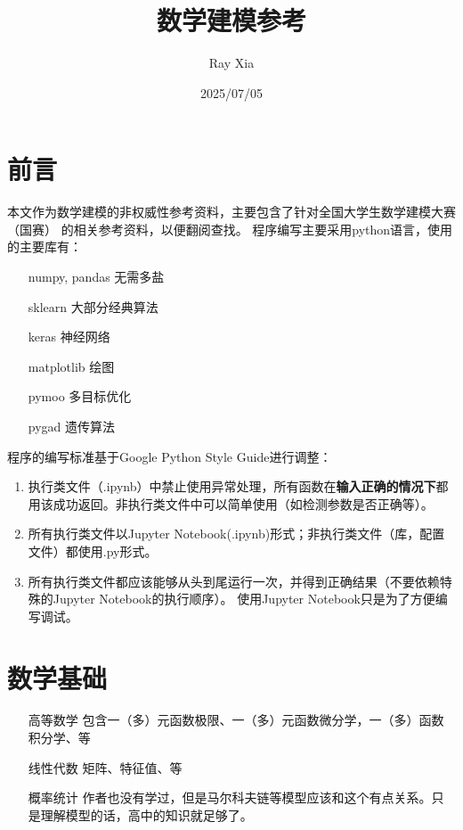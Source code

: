 \documentclass{article}
\title{数学建模参考}
\author{Ray Xia}
\date{2025/07/05}
\begin{document}
\maketitle

\tableofcontents

\newpage


\section{前言 }

本文作为数学建模的非权威性参考资料，主要包含了针对全国大学生数学建模大赛（国赛）
的相关参考资料，以便翻阅查找。
程序编写主要采用python语言，使用的主要库有：

\begin{itemize}
    \item[numpy, pandas] 无需多盐
    \item[sklearn] 大部分经典算法
    \item[keras] 神经网络
    \item[matplotlib] 绘图
    \item[pymoo] 多目标优化
    \item[pygad] 遗传算法
\end{itemize}

程序的编写标准基于Google Python Style Guide进行调整：

\begin{enumerate}
    \item 执行类文件（.ipynb）中禁止使用异常处理，所有函数在\textbf{输入正确的情况下}都用该成功返回。非执行类文件中可以简单使用（如检测参数是否正确等）。
    \item 所有执行类文件以Jupyter Notebook(.ipynb)形式；非执行类文件（库，配置文件）都使用.py形式。
    \item 所有执行类文件都应该能够从头到尾运行一次，并得到正确结果（不要依赖特殊的Jupyter Notebook的执行顺序）。
        使用Jupyter Notebook只是为了方便编写调试。
\end{enumerate}


\section{数学基础 }

\begin{itemize}
    \item[高等数学] 包含一（多）元函数极限、一（多）元函数微分学，一（多）函数积分学、等
    \item[线性代数] 矩阵、特征值、等
    \item[概率统计] 作者也没有学过，但是马尔科夫链等模型应该和这个有点关系。只是理解模型的话，高中的知识就足够了。
\end{itemize}
\end{document}
